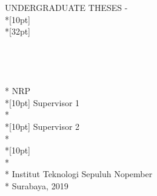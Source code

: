 \newpage
	\sffamily
	\thispagestyle{empty}
	{\noindent UNDERGRADUATE THESES - \kodematkul } \\*[10pt]
	{\large\textbf{\MakeUppercase{\judulengcover}}} \\*[32pt]
	\\
	\\
	\\
	\\
	\MakeUppercase{\penulis} \\*
	NRP \nrp \\*[10pt]
	Supervisor 1 \\*
	\pembimbingsatu \\*[10pt]
	Supervisor 2 \\*
	\pembimbingdua \\*[10pt]
	\MakeUppercase{\jurusaneng} \\*
	\fakultaseng \\*
	Institut Teknologi Sepuluh Nopember \\*
	Surabaya, 2019
	\rmfamily
	\normalsize
	\restoregeometry
	\color{black}
	\cleardoublepage
